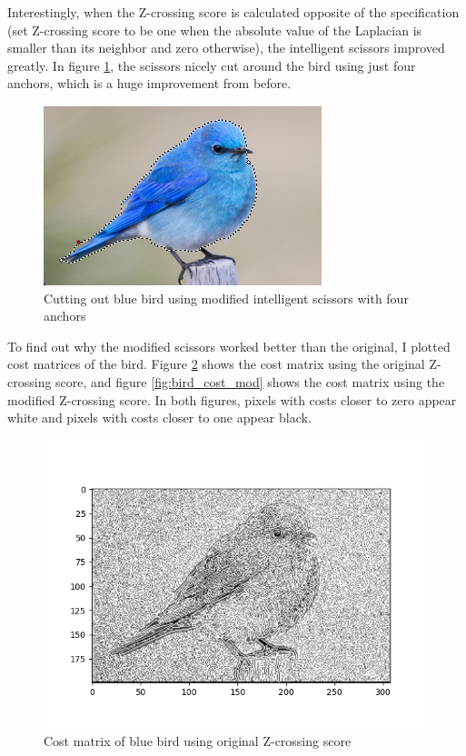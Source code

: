 \documentclass[11pt]{article}
\begin{document}
Interestingly, when the Z-crossing score is calculated opposite of the specification (set Z-crossing score to be one when the absolute value of the Laplacian is smaller than its neighbor and zero otherwise), the intelligent scissors improved greatly. In figure \ref{fig:bird_4}, the scissors nicely cut around the bird using just four anchors, which is a huge improvement from before.

\begin{figure}[H]
	\centering
	\includegraphics{sample_3anchor.png}
	\caption{\label{fig:bird_4}Cutting out blue bird using modified intelligent scissors with four anchors}
\end{figure}

To find out why the modified scissors worked better than the original, I plotted cost matrices of the bird. Figure \ref{fig:bird_cost_ori} shows the cost matrix using the original Z-crossing score, and figure \ref{fig:bird_cost_mod} shows the cost matrix using the modified Z-crossing score. In both figures, pixels with costs closer to zero appear white and pixels with costs closer to one appear black.

\begin{figure}[H]
	\centering
	\includegraphics{Cost_Bird_Original.png}
	\caption{\label{fig:bird_cost_ori}Cost matrix of blue bird using original Z-crossing score}
\end{figure}
\end{document}
